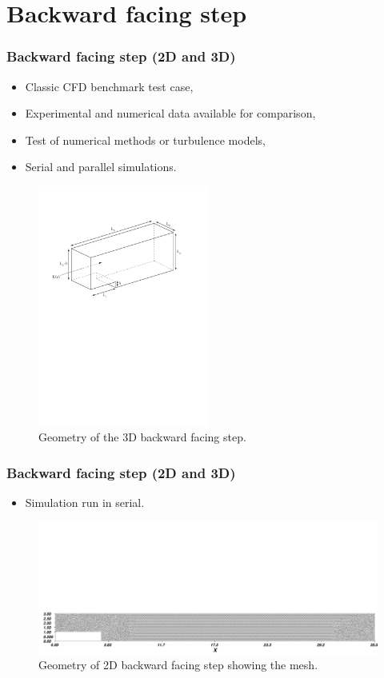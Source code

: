 \section{Backward facing step}

\begin{frame}
    \frametitle{Backward facing step (2D and 3D)}
\begin{itemize}
\item Classic CFD benchmark test case,
\item Experimental and numerical data available for comparison,
\item Test of numerical methods or turbulence models,
\item Serial and parallel simulations.
\end{itemize}
\begin{figure}
\centering
\includegraphics[width=0.5\textwidth]{./backward_facing_step/backward_facing_step_3d-schematic}
\caption{Geometry of the 3D backward facing step.}
\end{figure}
\end{frame}
%
\begin{frame}
    \frametitle{Backward facing step (2D and 3D)}
\begin{itemize}
\item Simulation run in serial.
\end{itemize}
\begin{figure}
\centering
\includegraphics[width=1.0\textwidth]{./backward_facing_step/backward_facing_step_2d-mesh}
\caption{Geometry of 2D backward facing step showing the mesh.}
\end{figure}
\end{frame}
